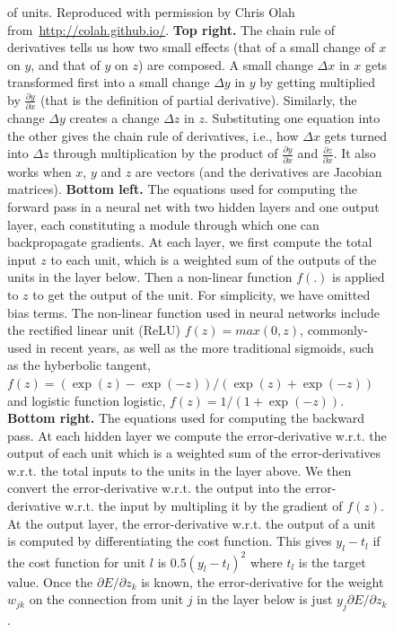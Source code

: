 \documentclass[10pts]{article}
\begin{document}
\begin{figure}[htp]
{\begin{minipage}{\textwidth}
{of units. Reproduced with permission by Chris Olah from~\url{http://colah.github.io/}.
\newline
{\bf Top right.} The chain rule of derivatives tells us how
two small effects (that of a small change of $x$ on $y$, and that of $y$ on $z$)
are composed. A small change $\Delta x$ in $x$
gets transformed first into a small change $\Delta y$ in $y$
by getting multiplied by $\frac{\partial y}{\partial x}$
(that is the definition of partial derivative). Similarly,
the change $\Delta y$ creates a change $\Delta z$ in $z$. Substituting one equation
into the other gives the chain rule of derivatives, i.e., how
$\Delta x$ gets turned into $\Delta z$ through multiplication
by the product of $\frac{\partial y}{\partial x}$ and
$\frac{\partial z}{\partial x}$. It also works when $x$, $y$
and $z$ are vectors (and the derivatives are Jacobian matrices). 
\newline
{\bf Bottom left.} 
The equations used for computing the forward pass in a neural
net with two hidden layers and one output layer, each constituting
a module through which one can backpropagate gradients. At each layer, we first compute the total
input $z$ to each unit, which is a weighted sum of the outputs of the
units in the layer below. Then a non-linear function $f(.)$ is applied
to $z$ to get the output of the unit.  For simplicity, we have omitted
bias terms. The non-linear function used in neural networks include 
the rectified linear unit (ReLU) $f(z) = max(0, z)$, commonly-used in 
recent years, as well as the more traditional sigmoids, such as the 
hyberbolic tangent, $f(z) = (\exp(z)-\exp(-z))/(\exp(z)+\exp(-z))$ 
and logistic function logistic, $f(z) = 1/(1+\exp(-z))$.
{\bf Bottom right.} 
The equations used for computing the backward pass. At each
hidden layer we compute the error-derivative w.r.t. the output of each
unit which is a weighted sum of the error-derivatives w.r.t. the total
inputs to the units in the layer above. We then convert the
error-derivative w.r.t. the output into the error-derivative w.r.t.
the input by multipling it by the gradient of $f(z)$.  At the output
layer, the error-derivative w.r.t. the output of a unit is computed by
differentiating the cost function. This gives $y_l-t_l$ if the cost
function for unit $l$ is $0.5(y_l-t_l)^2$ where $t_l$ is the target
value. Once the $\partial E/\partial z_k$ is known, the
error-derivative for the weight $w_{jk}$ on the connection from unit
$j$ in the layer below is just $y_j \partial E/\partial z_k$.
}
\label{fig:backprop-box}
\end{minipage}
}
\end{figure}
\end{document}

